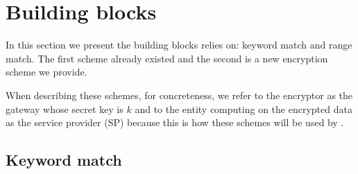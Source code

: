 


\section{Building blocks}

In this section we present the building blocks \sys relies on: keyword match and range match. The first scheme already existed and the second is a new encryption scheme we provide. 

When describing these schemes, for concreteness, we refer to the encryptor as the gateway whose secret key is $k$ and to the entity computing on the encrypted data as the service provider (SP) because this is how these schemes will be used by \sys.


\subsection{Keyword match}\label{s:kwmatch}


